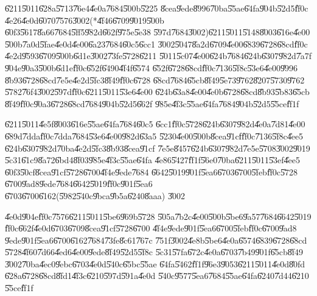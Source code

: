 \documentclass{article}
\begin{document}
\U{6211}\U{5011}\U{628a}\U{5713}\U{76e4}\U{4e0a}\U{7684}\U{500b}\U{5225}%
\U{8cea}\U{9ede}\U{8996}\U{70ba}\U{55ae}\U{64fa}\U{904b}\U{52d5}\U{ff0c}%
\U{4e26}\U{4e0d}\U{6070}\U{7576}\U{3002}(*\U{4f46}\U{6709}\U{9019}\U{500b}%
\U{60f3}\U{5617}\U{8a66}\U{7684}\U{5ff5}\U{982d}\U{662f}\U{975e}\U{5e38}%
\U{597d}\U{7684}\U{3002})\U{6211}\U{5011}\U{5148}\U{8003}\U{616e}\U{4e00}%
\U{500b}\U{7a0d}\U{5fae}\U{4e0d}\U{4e00}\U{6a23}\U{7684}\U{60c5}\U{6cc1}%
\U{3002}\U{5047}\U{8a2d}\U{6709}\U{4e00}\U{6839}\U{6728}\U{68cd}\U{ff0c}%
\U{4e2d}\U{9593}\U{6709}\U{500b}\U{6d1e}\U{3002}\U{73fe}\U{5728}\U{6211}%
\U{5011}\U{5c07}\U{4e00}\U{624b}\U{7684}\U{624b}\U{6307}\U{982d}\U{7a7f}%
\U{904e}\U{90a3}\U{500b}\U{6d1e}\U{ff0c}\U{652f}\U{6490}\U{4f4f}\U{6574}%
\U{652f}\U{6728}\U{68cd}\U{ff0c}\U{7136}\U{5f8c}\U{53e6}\U{4e00}\U{9996}%
\U{8b93}\U{6728}\U{68cd}\U{7e5e}\U{4e2d}\U{5fc3}\U{8f49}\U{ff0c}\U{6728}%
\U{68cd}\U{7684}\U{65cb}\U{8f49}\U{5e73}\U{9762}\U{8207}\U{5730}\U{9762}%
\U{5782}\U{76f4}\U{3002}\U{597d}\U{ff0c}\U{6211}\U{5011}\U{53e6}\U{4e00}%
\U{624b}\U{63a8}\U{4e00}\U{4e0b}\U{6728}\U{68cd}\U{8b93}\U{5b83}\U{65cb}%
\U{8f49}\U{ff0c}\U{90a3}\U{6728}\U{68cd}\U{7684}\U{904b}\U{52d5}\U{662f}%
\U{985e}\U{4f3c}\U{55ae}\U{64fa}\U{7684}\U{904b}\U{52d5}\U{55ce}\U{ff1f}

\U{6211}\U{5011}\U{4e5f}\U{8003}\U{616e}\U{55ae}\U{64fa}\U{7684}\U{60c5}%
\U{6cc1}\U{ff0c}\U{5728}\U{624b}\U{6307}\U{982d}\U{4e0a}\U{7d81}\U{4e00}%
\U{689d}\U{7dda}\U{ff0c}\U{7dda}\U{7684}\U{53e6}\U{4e00}\U{982d}\U{63a5}%
\U{5230}\U{4e00}\U{500b}\U{8cea}\U{91cf}\U{ff0c}\U{7136}\U{5f8c}\U{4ee5}%
\U{624b}\U{6307}\U{982d}\U{70ba}\U{4e2d}\U{5fc3}\U{8b93}\U{8cea}\U{91cf}%
\U{7e5e}\U{8457}\U{624b}\U{6307}\U{982d}\U{7e5e}\U{5708}\U{3002}\U{9019}%
\U{5c31}\U{61c9}\U{8a72}\U{6bd4}\U{8f03}\U{985e}\U{4f3c}\U{55ae}\U{64fa}%
\U{4e86}\U{5427}\U{ff1f}\U{56e0}\U{70ba}\U{6211}\U{5011}\U{53ef}\U{4ee5}%
\U{60f3}\U{50cf}\U{8cea}\U{91cf}\U{5728}\U{6700}\U{4f4e}\U{9ede}\U{7684}%
\U{6642}\U{5019}\U{901f}\U{5ea6}\U{6703}\U{6700}\U{5feb}\U{ff0c}\U{5728}%
\U{6700}\U{9ad8}\U{9ede}\U{7684}\U{6642}\U{5019}\U{ff0c}\U{901f}\U{5ea6}%
\U{6703}\U{6700}\U{6162}(\U{5982}\U{540c}\U{9bca}\U{9b5a}\U{6240}\U{8aaa})%
\U{3002}

\U{4e0d}\U{904e}\U{ff0c}\U{7576}\U{6211}\U{5011}\U{5be6}\U{969b}\U{5728}%
\U{505a}\U{7b2c}\U{4e00}\U{500b}\U{5be6}\U{9a57}\U{7684}\U{6642}\U{5019}%
\U{ff0c}\U{662f}\U{4e0d}\U{6703}\U{6709}\U{8cea}\U{91cf}\U{5728}\U{6700}%
\U{4f4e}\U{9ede}\U{901f}\U{5ea6}\U{6700}\U{5feb}\U{ff0c}\U{6700}\U{9ad8}%
\U{9ede}\U{901f}\U{5ea6}\U{6700}\U{6162}\U{7684}\U{73fe}\U{8c61}\U{767c}%
\U{751f}\U{3002}\U{4e8b}\U{5be6}\U{4e0a}\U{6574}\U{6839}\U{6728}\U{68cd}%
\U{5728}\U{4f60}\U{7d66}\U{4ed6}\U{4e00}\U{9ede}\U{8f49}\U{52d5}\U{5f8c}%
\U{5c31}\U{57fa}\U{672c}\U{4e0a}\U{6703}\U{7b49}\U{901f}\U{65cb}\U{8f49}%
\U{3002}\U{70ba}\U{4ec0}\U{9ebc}\U{6703}\U{4e0d}\U{540c}\U{65bc}\U{55ae}%
\U{64fa}\U{5462}\U{ff1f}\U{96e3}\U{9053}\U{6211}\U{5011}\U{4e0d}\U{80fd}%
\U{628a}\U{6728}\U{68cd}\U{8fd1}\U{4f3c}\U{6210}\U{597d}\U{591a}\U{4e0d}%
\U{540c}\U{9577}\U{5ea6}\U{7684}\U{55ae}\U{64fa}\U{6240}\U{7d44}\U{6210}%
\U{55ce}\U{ff1f}
\end{document}
